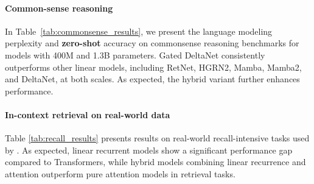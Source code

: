 \documentclass{article}
\begin{document}
\paragraph{Common-sense reasoning}  
In Table~\ref{tab:commonsense_results}, we present the language modeling perplexity and \textbf{zero-shot} accuracy on commonsense reasoning benchmarks for models with 400M and 1.3B parameters. Gated DeltaNet consistently outperforms other linear models, including RetNet, HGRN2, Mamba, Mamba2, and DeltaNet, at both scales. As expected, the hybrid variant further enhances performance.
\paragraph{In-context retrieval on real-world data}
 Table \ref{tab:recall_results} presents results on real-world recall-intensive tasks used by \citet{arora-2024-jrt}. As expected, linear recurrent models show a significant performance gap compared to Transformers, while hybrid models combining linear recurrence and attention outperform pure attention models in retrieval tasks.
 
\end{document}
